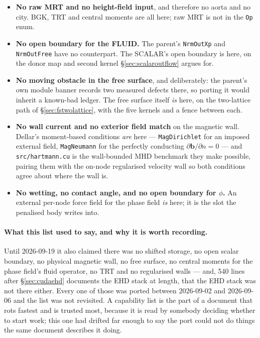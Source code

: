 \documentclass[11pt,a4paper]{article}
\newcommand{\code}[1]{\texttt{\small #1}}
\newcommand{\bb}{\bm{b}}
\begin{document}
\begin{itemize}[leftmargin=1.4em,itemsep=3pt]
\item \textbf{No raw MRT and no height-field input}, and therefore no aorta and
  no city. BGK, TRT and central moments are all here; raw MRT is not in the
  \code{Op} enum.
\item \textbf{No open boundary for the FLUID.} The parent's \code{NrmOutXp} and
  \code{NrmOutFree} have no counterpart. The SCALAR's open boundary is here, on
  the donor map and second kernel \S\ref{sec:scalaroutflow} argues for.
\item \textbf{No moving obstacle in the free surface}, and deliberately: the
  parent's own module banner records two measured defects there, so porting it
  would inherit a known-bad ledger. The free surface itself \emph{is} here, on
  the two-lattice path of \S\ref{sec:fstwolattice}, with the five kernels and a
  fence between each.
\item \textbf{No wall current and no exterior field match} on the magnetic wall.
  Dellar's moment-based conditions \emph{are} here --- \code{MagDirichlet} for an
  imposed external field, \code{MagNeumann} for the perfectly conducting
  $\partial\bb/\partial n = 0$ --- and \code{src/hartmann.cu} is the wall-bounded
  MHD benchmark they make possible, pairing them with the on-node regularised
  velocity wall so both conditions agree about where the wall is.
\item \textbf{No wetting, no contact angle, and no open boundary for $\phi$.} An
  external per-node force field for the phase field \emph{is} here; it is the
  slot the penalised body writes into.
\end{itemize}

\paragraph{What this list used to say, and why it is worth recording.} Until
2026-09-19 it also claimed there was no shifted storage, no open scalar boundary,
no physical magnetic wall, no free surface, no central moments for the phase
field's fluid operator, no TRT and no regularised walls --- and, 540 lines after
\S\ref{sec:cudaehd} documents the EHD stack at length, that the EHD stack was not
there either. Every one of those was ported between 2026-09-02 and 2026-09-06 and
the list was not revisited. A capability list is the part of a document that
rots fastest and is trusted most, because it is read by somebody deciding whether
to start work; this one had drifted far enough to say the port could not do
things the same document describes it doing.
\end{document}

